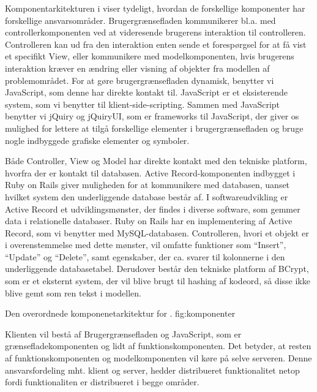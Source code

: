 Komponentarkitekturen i  viser tydeligt, hvordan de forskellige komponenter har forskellige ansvarsområder. Brugergrænsefladen kommunikerer bl.a. med controllerkomponenten ved at videresende brugerens interaktion til controlleren. Controlleren kan ud fra den interaktion enten sende et forespørgsel for at få vist et specifikt View, eller kommunikere med modelkomponenten, hvis brugerens interaktion kræver en ændring eller visning af objekter fra modellen af problemområdet. For at gøre brugergrænsefladen dynamisk, benytter vi JavaScript, som denne har direkte kontakt til. JavaScript er et eksisterende system, som vi benytter til klient-side-scripting. Sammen med JavaScript benytter vi jQuiry og jQuiryUI, som er frameworks til JavaScript, der giver os mulighed for lettere at tilgå forskellige elementer i brugergrænsefladen og bruge nogle indbyggede grafiske elementer og symboler.


Både Controller, View og Model har direkte kontakt med den tekniske platform, hvorfra der er kontakt til databasen. Active Record-komponenten indbygget i Ruby on Rails giver muligheden for at kommunikere med databasen, uanset hvilket system den underliggende database består af. I softwareudvikling er Active Record et udviklingsmønster, der findes i diverse software, som gemmer data i relationelle databaser. Ruby on Rails har en implementering af Active Record, som vi benytter med MySQL-databasen. Controlleren, hvori et objekt er i overenstemmelse med dette mønster, vil omfatte funktioner som ``Insert'', ``Update'' og ``Delete'', samt egenskaber, der ca. svarer til kolonnerne i den underliggende databasetabel.\cite{activerecordwiki} Derudover består den tekniske platform af BCrypt, som er et eksternt system, der vil blive brugt til hashing af kodeord, så disse ikke blive gemt som ren tekst i modellen.


	{Den overordnede komponenetarkitektur for \Foodl{}.}
	{fig:komponenter}


Klienten vil bestå af Brugergrænsefladen og JavaScript, som er grænsefladekomponenten og lidt af funktionskomponenten. Det betyder, at resten af funktionskomponenten og modelkomponenten vil køre på selve serveren. Denne ansvarsfordeling mht. klient og server, hedder distribueret funktionalitet netop fordi funktionaliten er distribueret i begge områder.
